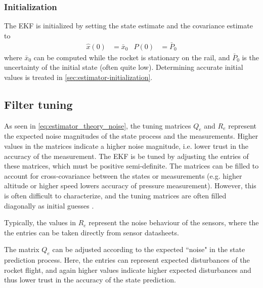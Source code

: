 \subsubsection{Initialization}
The EKF is initialized by setting the state estimate and the covariance estimate to 
\begin{align}
    \hat x (0) &= \bar x_0 & P(0) &= \bar P_0
\end{align}
where $\bar x_0$ can be computed while the rocket is stationary on the rail, and $\bar P_0$ is the uncertainty of the initial state (often quite low).
Determining accurate initial values is treated in \autoref{sec:estimator-initialization}.  



\subsection{Filter tuning}
\label{sec:estimator-tuning}
As seen in \autoref{eq:estimator_theory_noise}, the tuning matrices $Q_e$ and $R_e$ represent the expected noise magnitudes of the state process and the measurements.
Higher values in the matrices indicate a higher noise magnitude, i.e. lower trust in the accuracy of the measurement.
The EKF is be tuned by adjusting the entries of these matrices, which must be positive semi-definite.
The matrices can be filled to account for cross-covariance between the states or measurements (e.g. higher altitude or higher speed lowers accuracy of pressure measurement).
However, this is often difficult to characterize, and the tuning matrices are often filled diagonally as initial guesses \cite{werner2021}.

Typically, the values in $R_e$ represent the noise behaviour of the sensors, where the the entries can be taken directly from sensor datasheets.

The matrix $Q_e$ can be adjusted according to the expected ``noise" in the state prediction process. 
Here, the entries can represent expected disturbances of the rocket flight, and again higher values indicate higher expected disturbances and thus lower trust in the accuracy of the state prediction.

